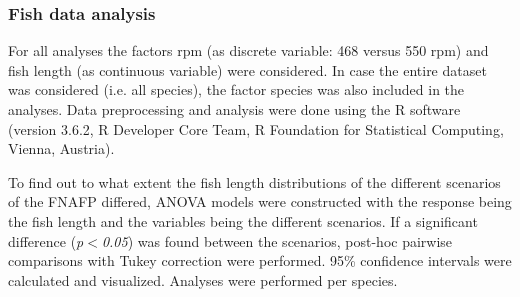 \documentclass[fleqn,10pt]{wlscirep}
\begin{document}
\subsubsection*{Fish data analysis}
For all analyses the factors rpm (as discrete variable: 468 versus 550 rpm) and fish length (as continuous variable) were considered. In case the entire dataset was considered (i.e. all species), the factor species was also included in the analyses. Data preprocessing and analysis were done using the R software (version 3.6.2, R Developer Core Team, R Foundation for Statistical Computing, Vienna, Austria).


To find out to what extent the fish length distributions of the different scenarios of the FNAFP differed, ANOVA models were constructed with the response being the fish length and the variables being the different scenarios. If a significant difference (\textit{p$<$0.05}) was found between the scenarios, post-hoc pairwise comparisons with Tukey correction were performed. 95\% confidence intervals were calculated and visualized. Analyses were performed per species.

\end{document}
